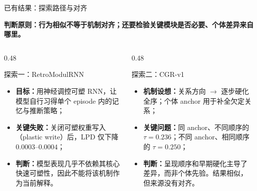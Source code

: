 \documentclass[aspectratio=169,11pt]{beamer}
\begin{document}
\begin{frame}{已有结果：探索路径与对齐}
  \footnotesize

  \centering
  \textbf{判断原则：行为相似不等于机制对齐；还要检验关键模块是否必要、个体差异来自哪里。}\par
  \vspace{0.35em}

  \begin{columns}[T,onlytextwidth]
    \begin{column}{0.48\textwidth}
      \begin{alertblock}{探索一：RetroModulRNN}
        \begin{itemize}
          \item \textbf{目标：}用神经调控可塑 RNN，让模型自行习得单个 episode 内的记忆与推断策略；
          \item \textbf{关键失败：}关闭可塑权重写入（plastic write）后，LPD 仅下降
                $0.0003$--$0.0004$；
          \item \textbf{判断：}模型表现几乎不依赖其核心快速可塑性，因此不能将该机制作为当前解释。
        \end{itemize}
      \end{alertblock}
    \end{column}
    \begin{column}{0.48\textwidth}
      \begin{block}{探索二：CGR-v1}
        \begin{itemize}
          \item \textbf{机制设想：}关系方向 $\rightarrow$ 逐步硬化全序；个体 anchor 用于补全欠定关系；
          \item \textbf{关键问题：}同 anchor、不同顺序的 $\tau=0.236$；不同 anchor、相同顺序的 $\tau=0.250$；
          \item \textbf{判断：}呈现顺序和早期硬化主导了差异，而非个体先验。结果相似，但来源没有对齐。
        \end{itemize}
      \end{block}
    \end{column}
  \end{columns}
\end{frame}
\end{document}
